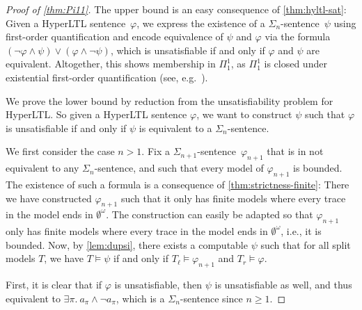 \documentclass[dvipsnames,10pt,a4paper]{amsart}
\theoremstyle{definition}
\theoremstyle{remark}
\newcommand{\hyltl}{{HyperLTL}\xspace}
\newcommand\Tl{T_\ell}
\newcommand\Tr {T_r}
\begin{document}
\begin{proof}[Proof of \autoref{thm:Pi11}]
  The upper bound is an easy consequence of \autoref{thm:hyltl-sat}: Given a \hyltl sentence~$\varphi$, we express the existence of a $\Sigma_n$-sentence~$\psi$ using first-order quantification and encode equivalence of $\psi$ and $\varphi$
via the formula~$(\lnot \varphi \land \psi) \lor (\varphi \land \lnot \psi)$, which is unsatisfiable if and only if $\varphi$ and $\psi$ are equivalent. Altogether, this shows membership in $\Pi_1^1$, as $\Pi_1^1$ is closed under existential first-order quantification (see, e.g.~\cite[Page 82]{hinman}).

  We prove the lower bound by reduction from the unsatisfiability problem for
  \hyltl. So given a \hyltl sentence $\varphi$, we want to
  construct $\psi$ such that $\varphi$ is unsatisfiable if and only if
  $\psi$ is equivalent to a $\Sigma_n$-sentence.

  \smallskip
  
  We first consider the case $n > 1$.
  Fix a $\Sigma_{n+1}$-sentence~$\varphi_{n+1}$ that is in not
  equivalent to any $\Sigma_n$-sentence, and such that every model of
  $\varphi_{n+1}$ is bounded.
  The existence of such a formula is a consequence of
  \autoref{thm:strictness-finite}:
  There we have constructed $\varphi_{n+1}$ such that it only has finite models where every trace in the model ends in $\emptyset^\omega$. 
  The construction can easily be adapted so that $\varphi_{n+1}$ only has finite models where every trace in the model ends in $\emptyset^\omega$, i.e., it is bounded.
  Now, by \autoref{lem:dupsi}, there exists a computable $\psi$ such that for all split models
  $T$, we have $T \models \psi$ if and only if $\Tl \models \varphi_{n+1}$
  and $\Tr  \models \varphi$.
  
  First, it is clear that if $\varphi$ is unsatisfiable, then $\psi$ is
  unsatisfiable as well, and thus equivalent to
  $\exists \pi.\ a_\pi \land \lnot a_\pi$, which is a $\Sigma_n$-sentence
  since $n \ge 1$.
  

\end{proof}
\end{document}
